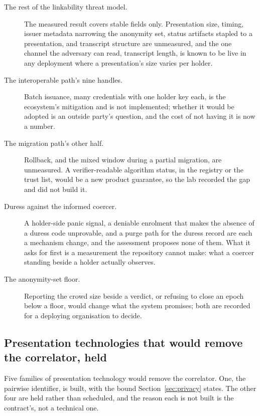 \begin{description}
  \item[The rest of the linkability threat model.] The measured result covers stable fields
    only. Presentation size, timing, issuer metadata narrowing the anonymity set, status artifacts
    stapled to a presentation, and transcript structure are unmeasured, and the one channel the
    adversary can read, transcript length, is known to be live in any deployment where a
    presentation's size varies per holder.
  \item[The interoperable path's nine handles.] Batch issuance, many credentials with one holder key
    each, is the ecosystem's mitigation and is not implemented; whether it would be adopted is an
    outside party's question, and the cost of not having it is now a number.
  \item[The migration path's other half.] Rollback, and the mixed window during a partial
    migration, are unmeasured. A verifier-readable algorithm status, in the registry or the trust
    list, would be a new product guarantee, so the lab recorded the gap and did not build it.
  \item[Duress against the informed coercer.] A holder-side panic signal, a deniable enrolment that
    makes the absence of a duress code unprovable, and a purge path for the duress record are each a
    mechanism change, and the assessment proposes none of them. What it asks for first is a
    measurement the repository cannot make: what a coercer standing beside a holder actually
    observes.
  \item[The anonymity-set floor.] Reporting the crowd size beside a  verdict, or
    refusing to close an epoch below a floor, would change what the system promises; both are
    recorded for a deploying organisation to decide.
\end{description}

\subsection{Presentation technologies that would remove the correlator, held}

Five families of presentation technology would remove the correlator. One, the pairwise identifier, is built, with the bound
Section~\ref{sec:privacy} states. The other four are held rather than scheduled, and the reason each
is not built is the contract's, not a technical one.

